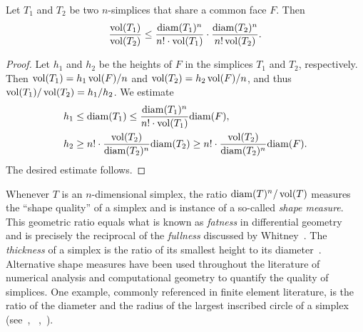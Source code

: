 \documentclass[a4paper]{amsart}
\begin{document}
\begin{lemma}\label{lemma:volumecomparison}
    Let $T_1$ and $T_2$ be two $n$-simplices that share a common face $F$. Then 
    \begin{align*}
        \frac{ \operatorname{vol}(T_1) }{ \operatorname{vol}(T_2) }
        \leq 
        \frac{{\operatorname{diam}}(T_1)^n}{n! \cdot \operatorname{vol}(T_1)} 
        \cdot 
        \frac{{\operatorname{diam}}(T_2)^n}{n! \operatorname{vol}(T_2)} 
        .
    \end{align*}
\end{lemma}
\begin{proof}
    Let $h_1$ and $h_2$ be the heights of $F$ in the simplices $T_1$ and $T_2$, respectively. 
    Then $\operatorname{vol}(T_1) = h_1 \operatorname{vol}(F)/n$ and $\operatorname{vol}(T_2) = h_2 \operatorname{vol}(F)/n$, and thus $\operatorname{vol}(T_1)/\operatorname{vol}(T_2) = h_1/h_2$.
    We estimate 
    \begin{align*}
        h_1 &\leq {\operatorname{diam}}(T_1) \leq \frac{{\operatorname{diam}}(T_1)^n}{n! \cdot \operatorname{vol}(T_1)} {\operatorname{diam}}(F),
        \\
        h_2 &\geq n! \cdot \frac{\operatorname{vol}(T_2)}{{\operatorname{diam}}(T_2)^n} {\operatorname{diam}}(T_2) \geq n! \cdot \frac{\operatorname{vol}(T_2)}{{\operatorname{diam}}(T_2)^n} {\operatorname{diam}}(F)
        .
    \end{align*}
    The desired estimate follows. 
\end{proof}


\begin{remark}
    Whenever $T$ is an $n$-dimensional simplex, the ratio ${\operatorname{diam}}(T)^n / \operatorname{vol}(T)$ measures the ``shape quality'' of a simplex and is instance of a so-called \emph{shape measure}. 
    This geometric ratio equals what is known as \emph{fatness} in differential geometry~\cite{cheeger1984curvature} and is precisely the reciprocal of the \emph{fullness} discussed by Whitney~\cite{whitney2012geometric}. 
    The \emph{thickness} of a simplex is the ratio of its smallest height to its diameter~\cite{munkres2016elementary}.
    Alternative shape measures have been used throughout the literature of numerical analysis and computational geometry to quantify the quality of simplices.
    One example, commonly referenced in finite element literature, is the ratio of the diameter and the radius of the largest inscribed circle of a simplex 
    (see~\cite[p.61, Definition 5.1]{braess2001finite}, ~\cite[p.97, Definition (4.2.16)]{brenner2008mathematical},~\cite[Definition~11.2]{ern2021finite}). 
\end{remark}
\end{document}
